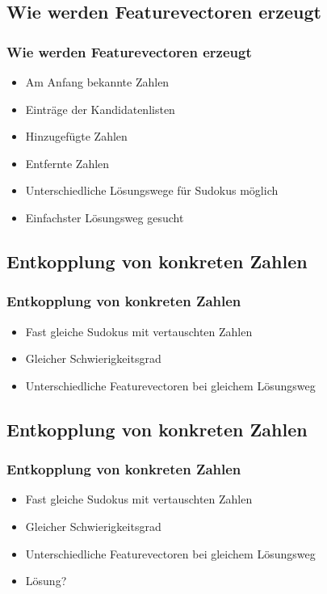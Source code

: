 \documentclass[accentcolor=tud6b,colorbacktitle,inverttitle,landscape,german,presentation,t]{tudbeamer}
\begin{document}
	\subsection{Wie werden Featurevectoren erzeugt}
		\begin{frame}
		\frametitle{Wie werden Featurevectoren erzeugt}
		\begin{itemize}
		\item Am Anfang bekannte Zahlen
		\item Einträge der Kandidatenlisten
		\item Hinzugefügte Zahlen
		\item Entfernte Zahlen
		\item Unterschiedliche Lösungswege für Sudokus möglich
		\item Einfachster Lösungsweg gesucht
		\end{itemize}
		\end{frame}

	\subsection{Entkopplung von konkreten Zahlen}
		\begin{frame}
		\frametitle{Entkopplung von konkreten Zahlen}
		\begin{itemize}
		\item Fast gleiche Sudokus mit vertauschten Zahlen
		\item Gleicher Schwierigkeitsgrad
		\item Unterschiedliche Featurevectoren bei gleichem Lösungsweg
		\end{itemize}
		\end{frame}
	\subsection{Entkopplung von konkreten Zahlen}
		\begin{frame}
		\frametitle{Entkopplung von konkreten Zahlen}
		\begin{itemize}
		\item Fast gleiche Sudokus mit vertauschten Zahlen
		\item Gleicher Schwierigkeitsgrad
		\item Unterschiedliche Featurevectoren bei gleichem Lösungsweg
		\item Lösung?
		\end{itemize}
		\end{frame}
\end{document}
